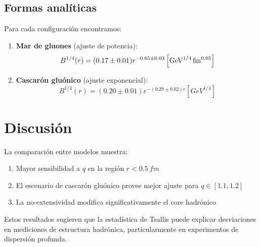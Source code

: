 \subsection{Formas analíticas}
Para cada configuración encontramos:

\begin{enumerate}
    \item \textbf{Mar de gluones} (ajuste de potencia):
    \begin{equation}
    {B}^{1/4}(r) = (0.17 \pm 0.01) {r}^{-0.65 \pm 0.03} \left[\unit[per-mode = fraction]{{GeV}^{1/4}.{fm}^{0.65}}\right] \label{eq-Bsea}
    \end{equation}
    \item \textbf{Cascarón gluónico} (ajuste exponencial):
    \begin{equation}
    {B}^{1/4}(r) = (0.20 \pm 0.01) e^{-(0.29 \pm 0.02)r} \left[\unit{{GeV}^{1/4}}\right] \label{eq-Bshell}
    \end{equation}
\end{enumerate}

\section{Discusión}

La comparación entre modelos muestra:

\begin{enumerate}[ i. ]
    \item Mayor sensibilidad a $q$ en la región $r < \qty{0.5}{fm}$
    \item El escenario de cascarón gluónico provee mejor ajuste para $q \in [1.1,1.2]$
    \item La no-extensividad modifica significativamente el core hadrónico
\end{enumerate}

\begin{remark}
    Estos resultados sugieren que la estadística de Tsallis puede explicar desviaciones en mediciones de estructura hadrónica, particularmente en experimentos de dispersión profunda.
\end{remark}
